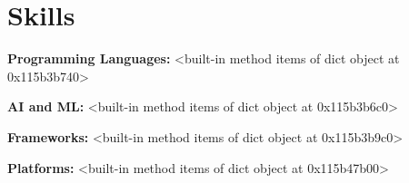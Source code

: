 \section{Skills}

    \begin{onecolentry}
        \textbf{Programming Languages:} <built-in method items of dict object at 0x115b3b740>
    \end{onecolentry}

    \vspace{0.05 cm}

    \begin{onecolentry}
        \textbf{AI and ML:} <built-in method items of dict object at 0x115b3b6c0>
    \end{onecolentry}

    \vspace{0.05 cm}

    \begin{onecolentry}
        \textbf{Frameworks:} <built-in method items of dict object at 0x115b3b9c0>
    \end{onecolentry}

    \vspace{0.05 cm}

    \begin{onecolentry}
        \textbf{Platforms:} <built-in method items of dict object at 0x115b47b00>
    \end{onecolentry}

    \vspace{0.05 cm}


